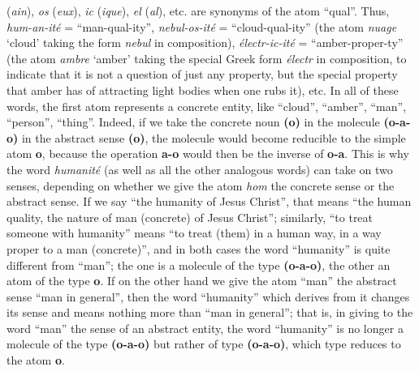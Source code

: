\begin{sloppypar}
{{     (\emph{ain}), \emph{os} (\emph{eux}), \emph{ic} (\emph{ique}),
     \emph{el} (\emph{al}), etc. are synonyms of the atom
     ``qual''. Thus, \emph{hum-an-ité} = ``man-qual-ity'',
     \emph{nebul-os-ité} = ``cloud-qual-ity'' (the atom \emph{nuage}
     `cloud' taking the form \emph{nebul} in composition),
     \emph{électr-ic-ité} = ``amber-proper-ty'' (the atom \emph{ambre}
     `amber' taking the special Greek form \emph{électr} in
     composition, to indicate that it is not a question of just any
     property, but the special property that amber has of attracting
     light bodies when one rubs it), etc. In all of these words, the
     first atom represents a concrete entity, like ``cloud'',
     ``amber'', ``man'', ``person'', ``thing''. Indeed, if we take the
     concrete noun \textbf{(o)} in the molecule
     \textbf{(o-a-o)} in the abstract sense \textbf{(o)}, the
     molecule would become reducible to the simple atom \textbf{o},
     because the operation \textbf{a-o} would then be the inverse of
     \textbf{o-a}. This is why the word \emph{humanité} (as well as
     all the other analogous words) can take on two senses, depending
     on whether we give the atom \emph{hom} the concrete sense or the
     abstract sense. If we say ``the humanity of Jesus Christ'', that
     means ``the human quality, the nature of man (concrete) of Jesus
     Christ''; similarly, ``to treat someone with humanity'' means
     ``to treat (them) in a human way, in a way proper to a man
     (concrete)'', and in both cases the word ``humanity'' is quite
     different from ``man''; the one is a molecule of the type
     \textbf{(o-a-o)}, the other an atom of the type
     \textbf{o}. If on the other hand we give the atom
     ``man'' the abstract sense ``man in general'', then the word
     ``humanity'' which derives from it changes its sense and means
     nothing more than ``man in general''; that is, in giving to the
     word ``man'' the sense of an abstract entity, the word
     ``humanity'' is no longer a molecule of the type
     \textbf{(o-a-o)} but rather of type \textbf{(o-a-o)},
     which type reduces to the atom \textbf{o}.
   }
 }

\end{sloppypar}
